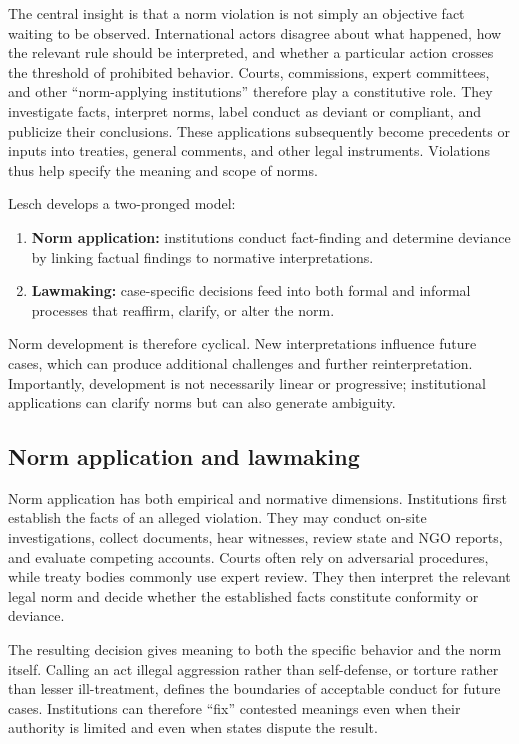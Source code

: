 The central insight is that a norm violation is not simply an objective fact waiting to be observed. International actors disagree about what happened, how the relevant rule should be interpreted, and whether a particular action crosses the threshold of prohibited behavior. Courts, commissions, expert committees, and other ``norm-applying institutions'' therefore play a constitutive role. They investigate facts, interpret norms, label conduct as deviant or compliant, and publicize their conclusions. These applications subsequently become precedents or inputs into treaties, general comments, and other legal instruments. Violations thus help specify the meaning and scope of norms.

Lesch develops a two-pronged model:
\begin{enumerate}
    \item \textbf{Norm application:} institutions conduct fact-finding and determine deviance by linking factual findings to normative interpretations.
    \item \textbf{Lawmaking:} case-specific decisions feed into both formal and informal processes that reaffirm, clarify, or alter the norm.
\end{enumerate}

Norm development is therefore cyclical. New interpretations influence future cases, which can produce additional challenges and further reinterpretation. Importantly, development is not necessarily linear or progressive; institutional applications can clarify norms but can also generate ambiguity.

\subsection{Norm application and lawmaking}

Norm application has both empirical and normative dimensions. Institutions first establish the facts of an alleged violation. They may conduct on-site investigations, collect documents, hear witnesses, review state and NGO reports, and evaluate competing accounts. Courts often rely on adversarial procedures, while treaty bodies commonly use expert review. They then interpret the relevant legal norm and decide whether the established facts constitute conformity or deviance.

The resulting decision gives meaning to both the specific behavior and the norm itself. Calling an act illegal aggression rather than self-defense, or torture rather than lesser ill-treatment, defines the boundaries of acceptable conduct for future cases. Institutions can therefore ``fix'' contested meanings even when their authority is limited and even when states dispute the result.

